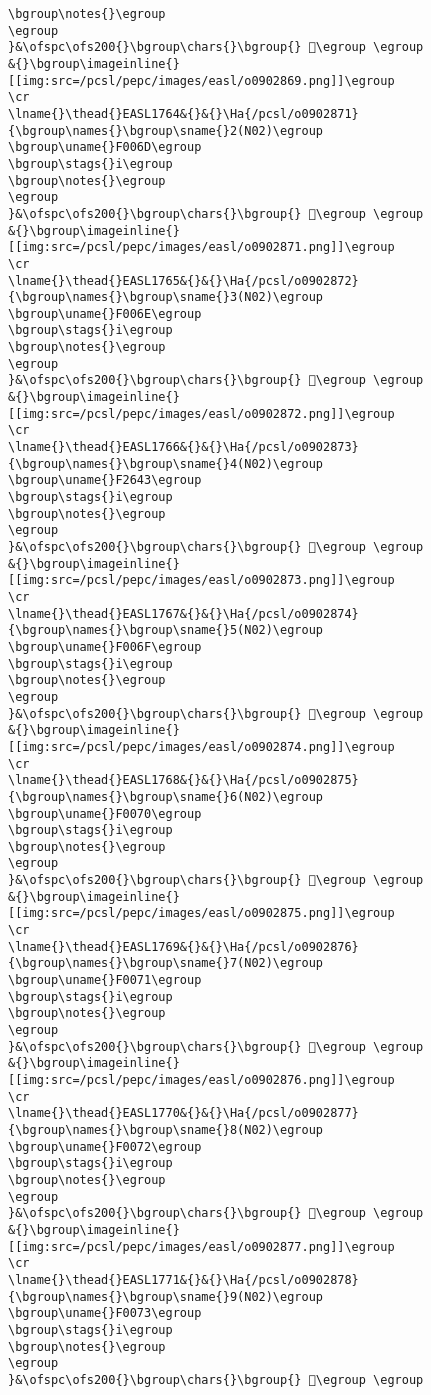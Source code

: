 \begin{verbatim}
\bgroup\notes{}\egroup
\egroup
}&\ofspc\ofs200{}\bgroup\chars{}\bgroup{} 󲖃\egroup \egroup
&{}\bgroup\imageinline{}[[img:src=/pcsl/pepc/images/easl/o0902869.png]]\egroup
\cr
\lname{}\thead{}EASL1764&{}&{}\Ha{/pcsl/o0902871}{\bgroup\names{}\bgroup\sname{}2(N02)\egroup
\bgroup\uname{}F006D\egroup
\bgroup\stags{}i\egroup
\bgroup\notes{}\egroup
\egroup
}&\ofspc\ofs200{}\bgroup\chars{}\bgroup{} 󰁭\egroup \egroup
&{}\bgroup\imageinline{}[[img:src=/pcsl/pepc/images/easl/o0902871.png]]\egroup
\cr
\lname{}\thead{}EASL1765&{}&{}\Ha{/pcsl/o0902872}{\bgroup\names{}\bgroup\sname{}3(N02)\egroup
\bgroup\uname{}F006E\egroup
\bgroup\stags{}i\egroup
\bgroup\notes{}\egroup
\egroup
}&\ofspc\ofs200{}\bgroup\chars{}\bgroup{} 󰁮\egroup \egroup
&{}\bgroup\imageinline{}[[img:src=/pcsl/pepc/images/easl/o0902872.png]]\egroup
\cr
\lname{}\thead{}EASL1766&{}&{}\Ha{/pcsl/o0902873}{\bgroup\names{}\bgroup\sname{}4(N02)\egroup
\bgroup\uname{}F2643\egroup
\bgroup\stags{}i\egroup
\bgroup\notes{}\egroup
\egroup
}&\ofspc\ofs200{}\bgroup\chars{}\bgroup{} 󲙃\egroup \egroup
&{}\bgroup\imageinline{}[[img:src=/pcsl/pepc/images/easl/o0902873.png]]\egroup
\cr
\lname{}\thead{}EASL1767&{}&{}\Ha{/pcsl/o0902874}{\bgroup\names{}\bgroup\sname{}5(N02)\egroup
\bgroup\uname{}F006F\egroup
\bgroup\stags{}i\egroup
\bgroup\notes{}\egroup
\egroup
}&\ofspc\ofs200{}\bgroup\chars{}\bgroup{} 󰁯\egroup \egroup
&{}\bgroup\imageinline{}[[img:src=/pcsl/pepc/images/easl/o0902874.png]]\egroup
\cr
\lname{}\thead{}EASL1768&{}&{}\Ha{/pcsl/o0902875}{\bgroup\names{}\bgroup\sname{}6(N02)\egroup
\bgroup\uname{}F0070\egroup
\bgroup\stags{}i\egroup
\bgroup\notes{}\egroup
\egroup
}&\ofspc\ofs200{}\bgroup\chars{}\bgroup{} 󰁰\egroup \egroup
&{}\bgroup\imageinline{}[[img:src=/pcsl/pepc/images/easl/o0902875.png]]\egroup
\cr
\lname{}\thead{}EASL1769&{}&{}\Ha{/pcsl/o0902876}{\bgroup\names{}\bgroup\sname{}7(N02)\egroup
\bgroup\uname{}F0071\egroup
\bgroup\stags{}i\egroup
\bgroup\notes{}\egroup
\egroup
}&\ofspc\ofs200{}\bgroup\chars{}\bgroup{} 󰁱\egroup \egroup
&{}\bgroup\imageinline{}[[img:src=/pcsl/pepc/images/easl/o0902876.png]]\egroup
\cr
\lname{}\thead{}EASL1770&{}&{}\Ha{/pcsl/o0902877}{\bgroup\names{}\bgroup\sname{}8(N02)\egroup
\bgroup\uname{}F0072\egroup
\bgroup\stags{}i\egroup
\bgroup\notes{}\egroup
\egroup
}&\ofspc\ofs200{}\bgroup\chars{}\bgroup{} 󰁲\egroup \egroup
&{}\bgroup\imageinline{}[[img:src=/pcsl/pepc/images/easl/o0902877.png]]\egroup
\cr
\lname{}\thead{}EASL1771&{}&{}\Ha{/pcsl/o0902878}{\bgroup\names{}\bgroup\sname{}9(N02)\egroup
\bgroup\uname{}F0073\egroup
\bgroup\stags{}i\egroup
\bgroup\notes{}\egroup
\egroup
}&\ofspc\ofs200{}\bgroup\chars{}\bgroup{} 󰁳\egroup \egroup

\end{verbatim}
